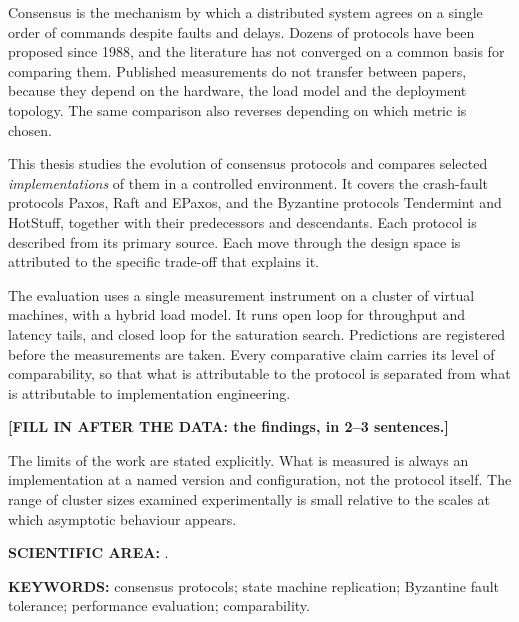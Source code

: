 %
%

Consensus is the mechanism by which a distributed system agrees on a
single order of commands despite faults and delays. Dozens of protocols
have been proposed since 1988, and the literature has not converged on a
common basis for comparing them. Published measurements do not transfer
between papers, because they depend on the hardware, the load model and
the deployment topology. The same comparison also reverses depending on
which metric is chosen.

This thesis studies the evolution of consensus protocols and compares
selected \emph{implementations} of them in a controlled environment. It
covers the crash-fault protocols Paxos, Raft and EPaxos, and the
Byzantine protocols Tendermint and HotStuff, together with their
predecessors and descendants. Each protocol is described from its
primary source. Each move through the design space is attributed to the
specific trade-off that explains it.

The evaluation uses a single measurement instrument on a cluster of
virtual machines, with a hybrid load model. It runs open loop for
throughput and latency tails, and closed loop for the saturation search.
Predictions are registered before the measurements are taken. Every
comparative claim carries its level of comparability, so that what is
attributable to the protocol is separated from what is attributable to
implementation engineering.

\textbf{[FILL IN AFTER THE DATA: the findings, in 2--3 sentences.]}

The limits of the work are stated explicitly. What is measured is always
an implementation at a named version and configuration, not the protocol
itself. The range of cluster sizes examined experimentally is small
relative to the scales at which asymptotic behaviour appears.

\vspace{1.2em}
\noindent\textbf{SCIENTIFIC AREA:} \thScientificAreaEN.

\vspace{0.6em}
\noindent\textbf{KEYWORDS:} consensus protocols; state machine
replication; Byzantine fault tolerance; performance evaluation;
comparability.

